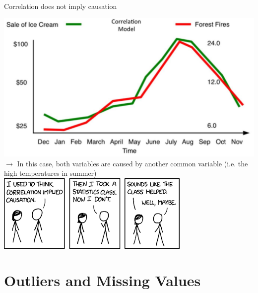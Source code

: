 \documentclass{beamer}
\begin{document}
\begin{frame}{Correlation does not imply causation}
\begin{center}
\includegraphics[scale=0.12]{correlation_causation.jpeg}\\
$\rightarrow$ In this case, both variables are caused by another common variable (i.e. the high temperatures in summer)\\
\vspace{0.4cm}
\includegraphics[scale=0.5]{correlation_causation_xkcd.png}\\
\end{center}
\end{frame}





\section{Outliers and Missing Values}
\end{document}
